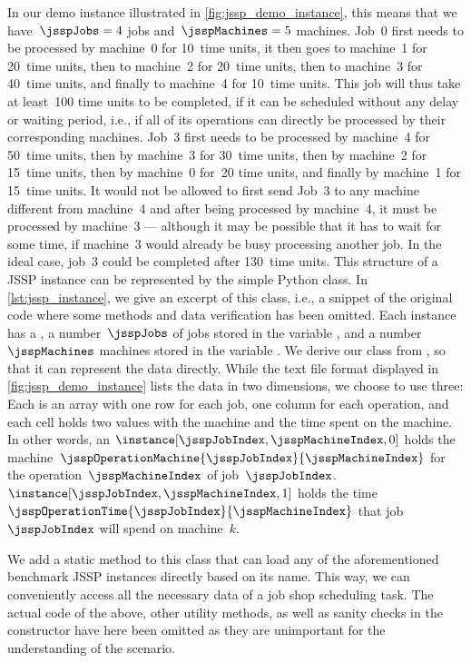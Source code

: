 In our demo instance illustrated in \autoref{fig:jssp_demo_instance}, this means that we have~$\jsspJobs=4$ jobs and~$\jsspMachines=5$ machines.
Job~0 first needs to be processed by machine~0 for 10~time units, it then goes to machine~1 for 20~time units, then to machine~2 for 20~time units, then to machine~3 for 40~time units, and finally to machine~4 for 10~time units.
This job will thus take at least~100 time units to be completed, if it can be scheduled without any delay or waiting period, i.e., if all of its operations can directly be processed by their corresponding machines.
Job~3 first needs to be processed by machine~4 for 50~time units, then by machine~3 for 30~time units, then by machine~2 for 15~time units, then by machine~0 for~20 time units, and finally by machine~1 for 15~time units.
It would not be allowed to first send Job~3 to any machine different from machine~4 and after being processed by machine~4, it must be processed by machine~3 --- although it may be possible that it has to wait for some time, if machine~3 would already be busy processing another job.
In the ideal case, job~3 could be completed after 130~time units.
\endhsection%
%
%
This structure of a JSSP instance can be represented by the simple Python class.
In \autoref{lst:jssp_instance}, we give an excerpt of this class, i.e., a snippet of the original code where some methods and data verification has been omitted.
Each instance has a , a number~$\jsspJobs$ of jobs stored in the variable , and a number~$\jsspMachines$ machines stored in the variable .
We derive our class from \href{https://numpy.org/doc/stable/reference/generated/numpy.ndarray.html}{}, so that it can represent the data directly.
While the text file format displayed in \autoref{fig:jssp_demo_instance} lists the data in two dimensions, we choose to use three:
Each  is an array with one row for each job, one column for each operation, and each cell holds two values with the machine and the time spent on the machine.
In other words, an $\instance[\jsspJobIndex, \jsspMachineIndex, 0]$ holds the machine~$\jsspOperationMachine{\jsspJobIndex}{\jsspMachineIndex}$ for the operation~$\jsspMachineIndex$ of job~$\jsspJobIndex$.
$\instance[\jsspJobIndex, \jsspMachineIndex, 1]$ holds the time~$\jsspOperationTime{\jsspJobIndex}{\jsspMachineIndex}$ that job~$\jsspJobIndex$ will spend on machine~$k$.


We add a static method  to this class that can load any of the aforementioned benchmark JSSP instances directly based on its name.
This way, we can conveniently access all the necessary data of a job shop scheduling task.
The actual code of the above, other utility methods, as well as sanity checks in the  constructor have here been omitted as they are unimportant for the understanding of the scenario.%
\endhsection%
\endhsection%
%
